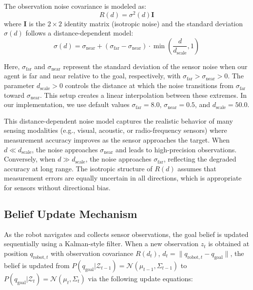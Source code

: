The observation noise covariance is modeled as:
\begin{equation}
    R(d) = \sigma^2(d) \mathbf{I}
\end{equation}
where $\mathbf{I}$ is the $2 \times 2$ identity matrix (isotropic noise) and the standard deviation $\sigma(d)$ follows a distance-dependent model:
\begin{equation}
    \sigma(d) = \sigma_{\text{near}} + (\sigma_{\text{far}} - \sigma_{\text{near}}) \cdot \min\left(\frac{d}{d_{\text{scale}}}, 1\right)
\end{equation}

Here, $\sigma_{\text{far}}$ and $\sigma_{\text{near}}$ represent the standard deviation of the sensor noise when our agent is far and near relative to the goal, respectively, with $\sigma_{\text{far}} > \sigma_{\text{near}} > 0$. The parameter $d_{\text{scale}} > 0$ controls the distance at which the noise transitions from $\sigma_{\text{far}}$ toward $\sigma_{\text{near}}$. This setup creates a linear interpolation between these extremes. In our implementation, we use default values $\sigma_{\text{far}} = 8.0$, $\sigma_{\text{near}} = 0.5$, and $d_{\text{scale}} = 50.0$.

This distance-dependent noise model captures the realistic behavior of many sensing modalities (e.g., visual, acoustic, or radio-frequency sensors) where measurement accuracy improves as the sensor approaches the target. When $d \ll d_{\text{scale}}$, the noise approaches $\sigma_{\text{near}}$ and leads to high-precision observations. Conversely, when $d \gg d_{\text{scale}}$, the noise approaches $\sigma_{\text{far}}$, reflecting the degraded accuracy at long range. The isotropic structure of $R(d)$ assumes that measurement errors are equally uncertain in all directions, which is appropriate for sensors without directional bias.

\subsection{Belief Update Mechanism}

As the robot navigates and collects sensor observations, the goal belief is updated sequentially using a Kalman-style filter. When a new observation $z_t$ is obtained at position $q_{\text{robot},t}$ with observation covariance $R(d_t)$, $d_t = \|q_{\text{robot},t} - q_{\text{goal}}\|$, the belief is updated from $P(q_{\text{goal}} | \mathcal{Z}_{t-1}) = \mathcal{N}(\mu_{t-1}, \Sigma_{t-1})$ to $P(q_{\text{goal}} | \mathcal{Z}_t) = \mathcal{N}(\mu_t, \Sigma_t)$ via the following update equations:

